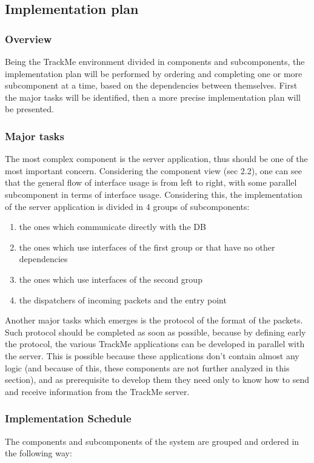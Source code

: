 {\color{secblue}\subsection{Implementation plan}}
{\color{secblue}\subsubsection{Overview}}
Being the TrackMe environment divided in components and subcomponents, the implementation plan will be performed by ordering and completing one or more subcomponent at a time, based on the dependencies between themselves. First the major tasks will be identified, then a more precise implementation plan will be presented.
{\color{secblue}\subsubsection{Major tasks}}
The most complex component is the server application, thus should be one of the most important concern. Considering the component view (sec 2.2), one can see that the general flow of interface usage is from left to right, with some parallel subcomponent in terms of interface usage. Considering this, the implementation of the server application is divided in 4 groups of subcomponents:

\begin{enumerate} 
\item the ones which communicate directly with the DB
\item the ones which use interfaces of the first group or that have no other dependencies
\item the ones which use interfaces of the second group
\item the dispatchers of incoming packets and the entry point
\end{enumerate}

Another major tasks which emerges is the protocol of the format of the packets. Such protocol should be completed as soon as possible, because by defining early the protocol, the various TrackMe applications can be developed in parallel with the server. This is possible because these applications don't contain almost any logic (and because of this, these components are not further analyzed in this section), and as prerequisite to develop them they need only to know how to send and receive information from the TrackMe server.

{\color{secblue}\subsubsection{Implementation Schedule}}
The components and subcomponents of the system are grouped and ordered in the following way:

